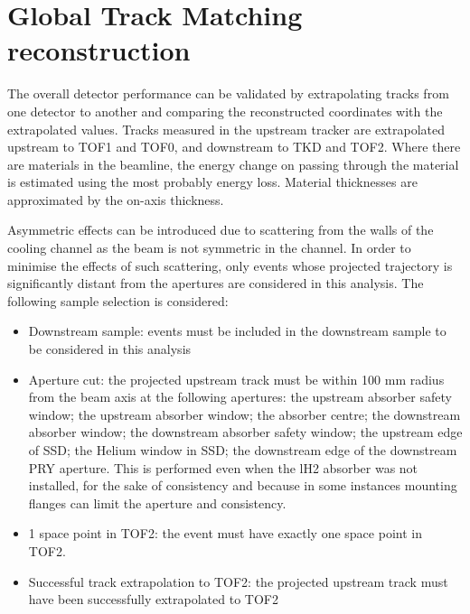 \graphicspath{{08-Track-matching/Figures/}}

\section{Global Track Matching reconstruction}
\label{Sect:TM}


\newcommand{\topmatterallplots}[4]{%
    \hspace*{-2.0cm}\texttt{[image: \#1/Figures/\#2/\#3.pdf]}
    \caption{#4 \label{fig:#3}}
    }

The overall detector performance can be validated by extrapolating tracks from
one detector to another and comparing the reconstructed coordinates with the 
extrapolated values.
Tracks measured in the upstream tracker are extrapolated upstream to TOF1 and TOF0, and downstream
to TKD and TOF2. Where there are materials in the beamline, the energy change on
passing through the material is estimated using the most probably energy loss. 
Material thicknesses are approximated by the on-axis thickness. 

Asymmetric effects can be introduced due to scattering from the walls of the
cooling channel as the beam is not symmetric in the channel. In order to 
minimise the effects of such scattering, only events whose projected 
trajectory is  significantly distant from the apertures are considered in this 
analysis. The following sample selection is considered:

\begin{itemize}
\item{Downstream sample:} events must be included in the downstream sample to
be considered in this analysis
\item{Aperture cut:} the projected upstream track must be within 100 mm radius 
from the beam axis at the following apertures: the upstream absorber safety window;
the upstream absorber window; the absorber centre; the downstream absorber window;
the downstream absorber safety window; the upstream edge of SSD; the Helium window
in SSD; the downstream edge of the downstream PRY aperture. This is performed
even when the lH2 absorber was not installed, for the sake of consistency and
because in some instances mounting flanges can limit the aperture and consistency.
\item{1 space point in TOF2:} the event must have exactly one space point in TOF2.
\item{Successful track extrapolation to TOF2:} the projected upstream track must
have been successfully extrapolated to TOF2
\end{itemize}


